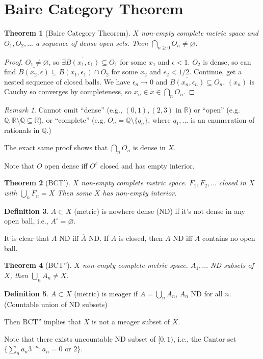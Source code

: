 \documentclass{article}
\theoremstyle{definition}
\newtheorem{defn}{Definition}[section]
\theoremstyle{remark}
\newtheorem{rem}{Remark}
\theoremstyle{plain}
\newtheorem{thm}[defn]{Theorem}
\newcommand{\QQ}{\mathbb{Q}}
\newcommand{\RR}{\mathbb{R}}
\begin{document}
\section{Baire Category Theorem}
\begin{thm}[Baire Category Theorem]
    $X$ non-empty complete metric space and $O_1,O_2,...$ a sequence of dense open sets. Then $\bigcap_{n\ge 0}O_n\neq\varnothing$.
\end{thm}
\begin{proof}
    $O_1\neq\varnothing$, so $\exists \overline{B(x_1,\epsilon_1)}\subseteq O_1$ for some $x_1$ and $\epsilon<1$. $O_2$ is dense, so can find $\overline{B(x_2,\epsilon)}\subseteq B(x_1,\epsilon_1)\cap O_2$ for some $x_2$ and $\epsilon_2<1/2$. Continue, get a nested sequence of closed balls. We have $\epsilon_n\to 0$ and $\overline{B(x_n,\epsilon_n)}\subseteq O_n$. $(x_n)$ is Cauchy so converges by completeness, so $x_n\in x\in\bigcap_nO_n$.
\end{proof}
\begin{rem}
    Cannot omit ``dense'' (e.g., $(0,1),(2,3)$ in $\RR$) or ``open'' (e.g. $\QQ,\RR\setminus\QQ\subseteq\RR$), or ``complete'' (e.g. $O_n=\QQ\setminus\{q_n\}$, where $q_1,...$ is an enumeration of rationals in $\QQ$.)

    The exact same proof shows that $\bigcap_n O_n$ is dense in $X$.
\end{rem}
Note that $O$ open dense iff $O^c$ closed and has empty interior.
\begin{thm}[BCT']
    $X$ non-empty complete metric space. $F_1,F_2,...$ closed in $X$ with $\bigcup_n F_n=X$ Then some $X$ has non-empty interior.
\end{thm}
\begin{defn}
    $A\subset X$ (metric) is nowhere dense (ND) if it's not dense in any open ball, i.e., $A^\circ=\varnothing$.
\end{defn}
It is clear that $A$ ND iff $\overline{A}$ ND. If $A$ is closed, then $A$ ND iff $A$ contains no open ball.
\begin{thm}[BCT'']
    $X$ non-empty complete metric space. $A_1,...$ ND subsets of $X$, then $\bigcup_n A_n\neq X$.
\end{thm}
\begin{defn}
    $A\subset X$ (metric) is meager if $A=\bigcup_nA_n$, $A_n$ ND for all $n$. (Countable union of ND subsets)
\end{defn}
Then BCT'' implies that $X$ is not a meager subset of $X$.

Note that there exists uncountable ND subset of $[0,1)$, i.e., the Cantor set $\{\sum_na_n3^{-n}:a_n=0\text{ or }2\}$.
\end{document}
